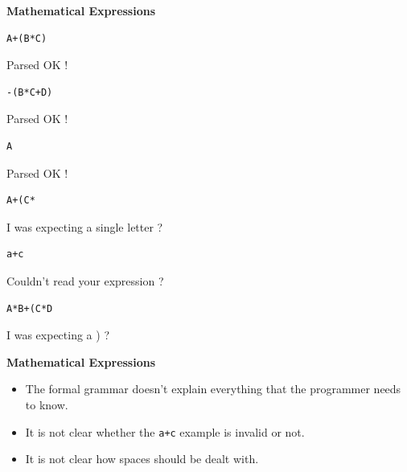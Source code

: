 \newpage
{\samepage
\begin{center}
{\Large{\bf Mathematical Expressions}}
\end{center}
{\bf \begin{verbatim}
A+(B*C)
\end{verbatim}}
Parsed OK !

{\bf \begin{verbatim}
-(B*C+D)
\end{verbatim}}
Parsed OK !

{\bf \begin{verbatim}
A
\end{verbatim}}
Parsed OK !

{\bf \begin{verbatim}
A+(C*
\end{verbatim}}
I was expecting a single letter ?

{\bf \begin{verbatim}
a+c
\end{verbatim}}
Couldn't read your expression ?

{\bf \begin{verbatim}
A*B+(C*D
\end{verbatim}}
I was expecting a ) ?
}

\newpage
{\samepage
\begin{center}
{\Large{\bf Mathematical Expressions}}
\end{center}
\begin{itemize}
\item The formal grammar doesn't explain everything that the
programmer needs to know.
\item It is not clear whether the \verb^a+c^ example is
invalid or not.
\item It is not clear how spaces should be dealt with.
\end{itemize}
}
